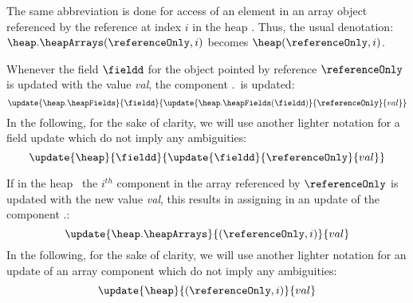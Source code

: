 The same abbreviation is done for access of an element in an  array object referenced by the reference 
  at index $i$ in the heap \heap. Thus, the usual denotation:
$ \heap . \heapArrays (\referenceOnly, i )$ becomes $ \heap(\referenceOnly, i )$.
 
 




 
   Whenever the  field $\fieldd$ for the object pointed by reference
 $\referenceOnly$ is updated  with the value \textit{val},
 the component \heap.\heapFields \ is updated:
 $$ \update{\heap.\heapFields}{\fieldd}{\update{\heap.\heapFields(\fieldd)}{\referenceOnly}{val}} $$  
 In the following, for the sake of clarity, we will use another lighter notation for a field update which do not imply any ambiguities:
 $$ 
  \update{\heap}{\fieldd}{\update{\fieldd}{\referenceOnly}{val}} 
 $$ 



 If in the heap \heap \ 
 the $i^{th}$ component in the array referenced by $\referenceOnly$ is updated with the new value \textit{val},
 this results in assigning in an update of the component \heap.\heapArrays:
 $$\update{\heap.\heapArrays}{(\referenceOnly , i)}{val} $$ 
 In the following, for the sake of clarity, we will use another lighter notation for an update of an array component
 which do not imply any ambiguities:
 $$ 
  \update{\heap}{(\referenceOnly , i) }{val} 
 $$ 

 
 

